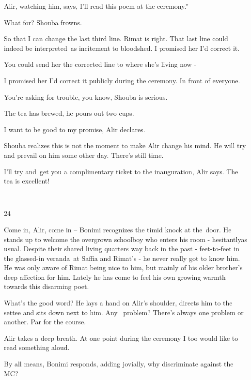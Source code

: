 \documentclass[12pt]{book}
\begin{document}
Alir, watching him, says, {\textquotedbl}I'll read this poem at the ceremony.''~

{\textquotedbl}What for?{\textquotedbl} Shouba frowns. \

{\textquotedbl}So that I can change the last third line. Rimat is right. That last line could indeed be interpreted~as
incitement to bloodshed. I promised her I'd correct it.{\textquotedbl}

{\textquotedbl}You could send her the corrected line to where she's living now -{\textquotedbl}

{\textquotedbl}I promised her I'd correct it publicly during the ceremony. In front of everyone.{\textquotedbl}~

{\textquotedbl}You're asking for trouble, you know,{\textquotedbl} Shouba is serious.

The tea has brewed, he pours out two cups.

{\textquotedbl}I want to be good to my promise,{\textquotedbl} Alir declares.

Shouba realizes this is not the moment to make Alir change his mind. He will try and prevail on him some other day.
There's still time.

{\textquotedbl}I'll try and~get you a complimentary ticket to the inauguration,{\textquotedbl} Alir says.
{\textquotedbl}The tea is excellent!{\textquotedbl}

~

24~

{\textquotedbl}Come in, Alir, come in -- {\textquotedbl} Bonimi recognizes the timid knock at the~door. He stands up to
welcome the overgrown schoolboy who enters his room - hesitantlyas usual. Despite their shared living quarters way back
in the past - feet-to-feet in the glassed-in veranda~at Saffia and Rimat's{ }{}- he never really got to
know him. He was only aware of Rimat being nice to him, but mainly of his older brother's deep affection for him.
Lately he has come to feel his own growing warmth towards this disarming poet.

{\textquotedbl}What's the good word?{\textquotedbl} He lays a hand on Alir's shoulder, directs him to the settee and
sits down next to him. {\textquotedbl}Any \ problem? There's always one problem or another. Par for the
course.{\textquotedbl}

Alir takes a deep breath. {\textquotedbl}At one point during the ceremony I too would like to read something
aloud.{\textquotedbl}

{\textquotedbl}By all means,{\textquotedbl} Bonimi responds, adding jovially, {\textquotedbl}why discriminate against
the MC?{\textquotedbl}
\end{document}

